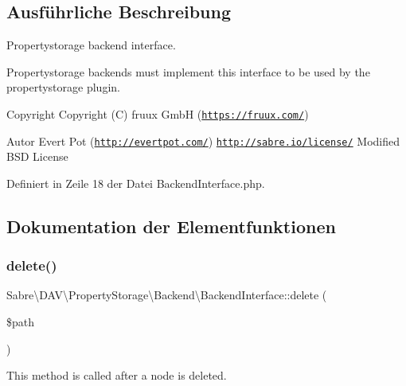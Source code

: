 \subsection{Ausführliche Beschreibung}
Propertystorage backend interface.

Propertystorage backends must implement this interface to be used by the propertystorage plugin.

\begin{DoxyCopyright}{Copyright}
Copyright (C) fruux GmbH (\href{https://fruux.com/}{\tt https\+://fruux.\+com/}) 
\end{DoxyCopyright}
\begin{DoxyAuthor}{Autor}
Evert Pot (\href{http://evertpot.com/}{\tt http\+://evertpot.\+com/})  \href{http://sabre.io/license/}{\tt http\+://sabre.\+io/license/} Modified B\+SD License 
\end{DoxyAuthor}


Definiert in Zeile 18 der Datei Backend\+Interface.\+php.



\subsection{Dokumentation der Elementfunktionen}
\mbox{\label{interface_sabre_1_1_d_a_v_1_1_property_storage_1_1_backend_1_1_backend_interface_a4930add42ecbd12a23515224b7c73e6c}} 
\subsubsection{\texorpdfstring{delete()}{delete()}}
{\footnotesize\ttfamily Sabre\textbackslash{}\+D\+A\+V\textbackslash{}\+Property\+Storage\textbackslash{}\+Backend\textbackslash{}\+Backend\+Interface\+::delete (\begin{DoxyParamCaption}\item[{}]{\$path }\end{DoxyParamCaption})}

This method is called after a node is deleted.

